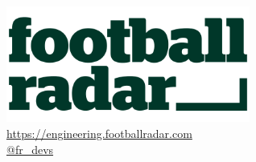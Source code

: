 \documentclass{beamer}
\begin{document}
\begin{frame}
  \begin{center}
    \vspace{0.3in}
    \includegraphics[width=8cm]{logo-white.png}\\
    \url{https://engineering.footballradar.com}\\
    \url{@fr_devs}
  \end{center}
\end{frame}
\end{document}
